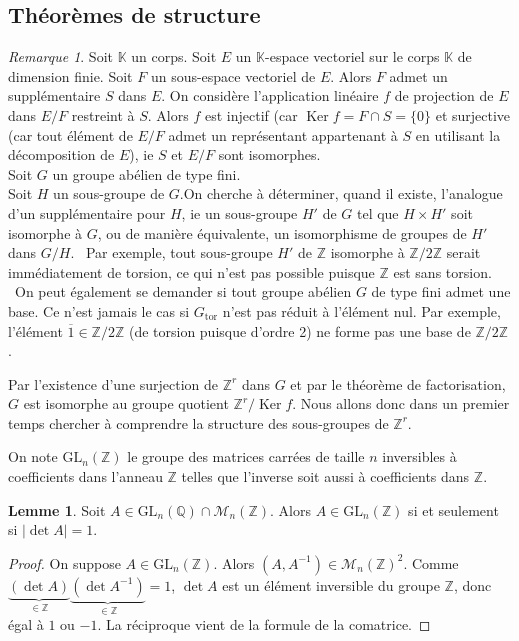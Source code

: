 \documentclass{article}
\newcommand{\Q}{\mathbb{Q}}
\newcommand{\Z}{\mathbb{Z}}
\newcommand{\K}{\mathbb{K}}
\renewcommand{\ker}{\mathop{\mathrm{Ker}}\nolimits}
\newcommand{\Gt}{G_{\mathrm{tor}}}
\theoremstyle{definition}
\newtheorem{lem}[defi]{Lemme}
\theoremstyle{remark}
\newtheorem{rem}{Remarque}
\begin{document}
\subsection{Théorèmes de structure}

\begin{rem}
Soit $\K$ un corps. Soit $E$ un $\K$-espace vectoriel sur le corps $\K$ de dimension finie. Soit $F$ un sous-espace vectoriel de $E$. Alors $F$ admet un supplémentaire $S$ dans $E$. On considère l'application linéaire $f$ de projection de $E$ dans $E/F$ restreint à $S$. Alors $f$ est  injectif (car $\ker f = F \cap S =\{0\}$ et surjective (car tout élément de $E/F$ admet un représentant appartenant à $S$ en utilisant la décomposition de $E$), ie $S$ et $E/F$ sont isomorphes. \\

Soit $G$ un groupe abélien de type fini. \\ 

Soit $H$ un sous-groupe de $G$.On cherche à déterminer, quand il existe, l'analogue d'un supplémentaire pour $H$, ie un sous-groupe $H'$ de $G$ tel que $H \times H'$ soit isomorphe à $G$, ou de manière équivalente, un isomorphisme de groupes de $H'$ dans $G/H$. \
Par exemple, tout sous-groupe $H'$ de $\Z$ isomorphe à $\Z/2\Z$ serait immédiatement de torsion, ce qui n'est pas possible puisque $\Z$ est sans torsion. \
On peut également se demander si tout groupe abélien $G$ de type fini admet une base. Ce n'est jamais le cas si $\Gt$ n'est pas réduit à l'élément nul. Par exemple, l'élément $\overline{1} \in \Z/2\Z$ (de torsion puisque d'ordre 2) ne forme pas une base de $\Z/2\Z$. \\
\end{rem}

Par l'existence d'une surjection de $\Z^r$ dans $G$ et par le théorème de factorisation, $G$ est isomorphe au groupe quotient $\Z^r/\ker f$. Nous allons donc dans un premier temps chercher à comprendre la structure des sous-groupes de $\Z^r$. 

On note $\textrm{GL}_n(\Z)$ le groupe des matrices carrées de taille $n$ inversibles à coefficients dans l'anneau $\Z$ telles que l'inverse soit aussi à coefficients dans $\Z$.

\begin{lem}
Soit $A \in \textrm{GL}_n(\Q) \cap \mathcal{M}_n(\Z)$. Alors $A \in \textrm{GL}_n(\Z)$ si et seulement si $\vert \det A \vert =1$.
\end{lem}

\begin{proof}
On suppose $A \in \textrm{GL}_n(\Z)$. Alors $(A, A^{-1}) \in \mathcal{M}_n(\Z)^2$. Comme $\underbrace{(\det A)}_{\in \Z}\underbrace{(\det A^{-1})}_{\in \Z}=1$, $\det A$ est un élément inversible du groupe $\Z$, donc égal à $1$ ou $-1$. La réciproque vient de la formule de la comatrice.
\end{proof}
\end{document}
